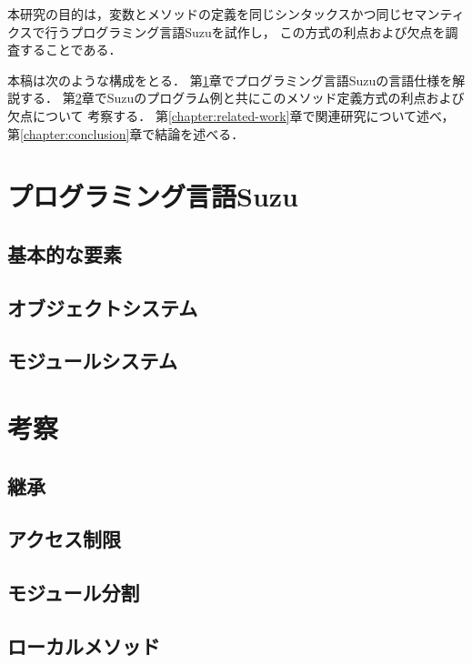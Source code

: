\documentclass[a4paper,11pt,dvipdfmx]{jreport}
\begin{document}
本研究の目的は，変数とメソッドの定義を同じシンタックスかつ同じセマンティクスで行うプログラミング言語Suzuを試作し，
この方式の利点および欠点を調査することである．

本稿は次のような構成をとる．
第\ref{chapter:implementation}章でプログラミング言語Suzuの言語仕様を解説する．
第\ref{chapter:discussion}章でSuzuのプログラム例と共にこのメソッド定義方式の利点および欠点について
考察する．
第\ref{chapter:related-work}章で関連研究について述べ，
第\ref{chapter:conclusion}章で結論を述べる．


\chapter{プログラミング言語Suzu}
\label{chapter:implementation}

\section{基本的な要素}

\section{オブジェクトシステム}

\section{モジュールシステム}


\chapter{考察}
\label{chapter:discussion}

\section{継承}

\section{アクセス制限}

\section{モジュール分割}

\section{ローカルメソッド}
\end{document}
